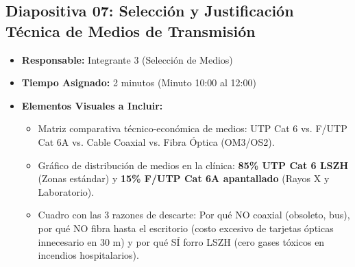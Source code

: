 \documentclass[11pt,a4paper]{article}
\begin{document}
\newpage

\subsection{Diapositiva 07: Selección y Justificación Técnica de Medios de Transmisión}
\begin{itemize}[leftmargin=*]
    \item \textbf{Responsable:} Integrante 3 (Selección de Medios)
    \item \textbf{Tiempo Asignado:} 2 minutos (Minuto 10:00 al 12:00)
    \item \textbf{Elementos Visuales a Incluir:}
    \begin{itemize}
        \item Matriz comparativa técnico-económica de medios: UTP Cat 6 vs. F/UTP Cat 6A vs. Cable Coaxial vs. Fibra Óptica (OM3/OS2).
        \item Gráfico de distribución de medios en la clínica: \textbf{85\% UTP Cat 6 LSZH} (Zonas estándar) y \textbf{15\% F/UTP Cat 6A apantallado} (Rayos X y Laboratorio).
        \item Cuadro con las 3 razones de descarte: Por qué NO coaxial (obsoleto, bus), por qué NO fibra hasta el escritorio (costo excesivo de tarjetas ópticas innecesario en 30 m) y por qué SÍ forro LSZH (cero gases tóxicos en incendios hospitalarios).
    \end{itemize}
\end{itemize}
\end{document}
